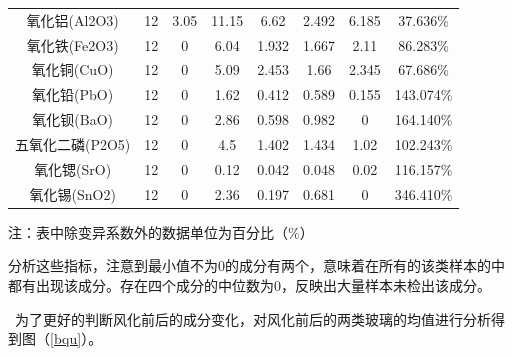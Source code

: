\documentclass{my_paper}
\begin{document}
\begin{table}[ht]
\begin{tabular}{cccccccc}
氧化铝(Al2O3)           & 12                   & 3.05                 & 11.15                & 6.62                 & 2.492                & 6.185                & 37.636\%             \\
氧化铁(Fe2O3)           & 12                   & 0                    & 6.04                 & 1.932                & 1.667                & 2.11                 & 86.283\%             \\
氧化铜(CuO)             & 12                   & 0                    & 5.09                 & 2.453                & 1.66                 & 2.345                & 67.686\%             \\
氧化铅(PbO)             & 12                   & 0                    & 1.62                 & 0.412                & 0.589                & 0.155                & 143.074\%            \\
氧化钡(BaO)             & 12                   & 0                    & 2.86                 & 0.598                & 0.982                & 0                    & 164.140\%            \\
五氧化二磷(P2O5)          & 12                   & 0                    & 4.5                  & 1.402                & 1.434                & 1.02                 & 102.243\%            \\
氧化锶(SrO)             & 12                   & 0                    & 0.12                 & 0.042                & 0.048                & 0.02                 & 116.157\%            \\
氧化锡(SnO2)            & 12                   & 0                    & 2.36                 & 0.197                & 0.681                & 0                    & 346.410\%            \\
    \bottomrule
      \end{tabular}
    \label{index1}

    注：表中除变异系数外的数据单位为百分比（$\%$）
      \end{table}
分析这些指标，注意到最小值不为$0$的成分有两个，意味着在所有的该类样本的中都有出现该成分。存在四个成分的中位数为0，反映出大量样本未检出该成分。

\newpage
\,
\newpage
为了更好的判断风化前后的成分变化，对风化前后的两类玻璃的均值进行分析得到图（\ref{bqu}）。
\end{document}
